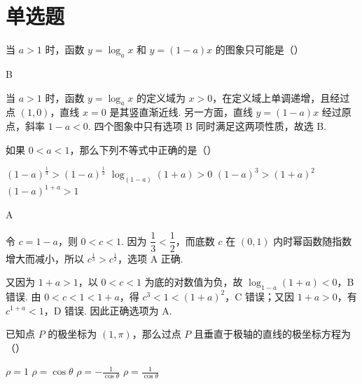 \documentclass[UTF8,a4paper,oneside,11pt]{ctexbook}
\begin{document}
\section{单选题}

\begin{problem}
当 \(a > 1\) 时，函数 \(y = \log_a x\) 和 \(y = (1 - a)x\) 的图象只可能是（\quad）

\choices
    {}
    {}
    {}
    {}
\end{problem}

\begin{answer}
B
\end{answer}

\begin{solution}
当 \(a>1\) 时，函数 \(y=\log_a x\) 的定义域为 \(x>0\)，在定义域上单调递增，且经过点 \((1,0)\)，直线 \(x=0\) 是其竖直渐近线. 另一方面，直线 \(y=(1-a)x\) 经过原点，斜率 \(1-a<0\). 四个图象中只有选项 B 同时满足这两项性质，故选 B.
\end{solution}

\begin{problem}
如果 \(0 < a < 1\)，那么下列不等式中正确的是（\quad）

\choices
    {\((1 - a)^{\frac{1}{3}} > (1 - a)^{\frac{1}{2}}\)}
    {\(\log_{(1 - a)}(1 + a) > 0\)}
    {\((1 - a)^3 > (1 + a)^2\)}
    {\((1 - a)^{1 + a} > 1\)}
\end{problem}

\begin{answer}
A
\end{answer}

\begin{solution}
令 \(c=1-a\)，则 \(0<c<1\). 因为 \(\dfrac{1}{3}<\dfrac{1}{2}\)，而底数 \(c\) 在 \((0,1)\) 内时幂函数随指数增大而减小，所以 \(c^{\frac{1}{3}}>c^{\frac{1}{2}}\)，选项 A 正确.

又因为 \(1+a>1\)，以 \(0<c<1\) 为底的对数值为负，故 \(\log_{1-a}(1+a)<0\)，B 错误. 由 \(0<c<1<1+a\)，得 \(c^3<1<(1+a)^2\)，C 错误；又因 \(1+a>0\)，有 \(c^{1+a}<1\)，D 错误. 因此正确选项为 A.
\end{solution}

\begin{problem}
已知点 \(P\) 的极坐标为 \((1,\pi)\)，那么过点 \(P\) 且垂直于极轴的直线的极坐标方程为（\quad）

\choices
    {\(\rho = 1\)}
    {\(\rho = \cos \theta\)}
    {\(\rho = -\frac{1}{\cos \theta}\)}
    {\(\rho = \frac{1}{\cos \theta}\)}
\end{problem}
\end{document}
